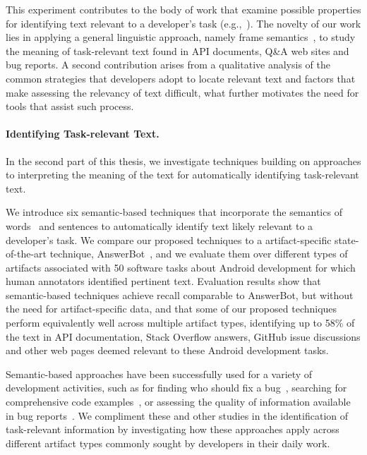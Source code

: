 This experiment contributes to the body of work that examine possible properties for identifying text relevant to a developer's task (e.g.,~\cite{Forward2002, Jiang2016b, Robillard2015, Bavota2016}).
The novelty of our work lies in 
applying a general
linguistic approach, namely frame semantics~\cite{fillmore1976frame, Baker1998}, to study the meaning of task-relevant text found in 
API documents, Q\&A web sites and bug reports.
A second contribution arises from a qualitative analysis of
the common strategies that developers adopt to locate relevant text 
and factors that make assessing the relevancy of text difficult,
what further motivates the need for tools that assist such process.






\paragraph{\textbf{Identifying Task-relevant Text.}} 


In the second part of this thesis, we investigate
techniques building on approaches to interpreting the meaning of the text 
for automatically identifying task-relevant text.


We introduce six semantic-based techniques that incorporate the semantics of words~\cite{Mikolov2013} and sentences to automatically identify text likely relevant to a developer's task.
We compare our proposed techniques to a artifact-specific state-of-the-art technique, AnswerBot~\cite{Xu2017},
and we evaluate them over different types of artifacts
associated with 50 software tasks about Android development
for which human annotators identified pertinent text.
Evaluation results show that semantic-based techniques
achieve recall comparable to AnswerBot, but without the need for artifact-specific data,
and that some of our proposed techniques perform equivalently well across
multiple artifact types, identifying up to 58\%
of the text 
in API documentation, Stack Overflow answers,
GitHub issue discussions and other web pages
deemed relevant to these Android development tasks.


Semantic-based approaches have been successfully used for a variety of development activities, such as
for finding who should fix a bug~\cite{yang2016}, searching for comprehensive code examples~\cite{silva2019},
or assessing the quality of information available in bug reports~\cite{chaparro2019}.
We compliment these and other studies in the identification of task-relevant information
by investigating how these approaches apply across different artifact types
commonly sought by developers in their daily work.




